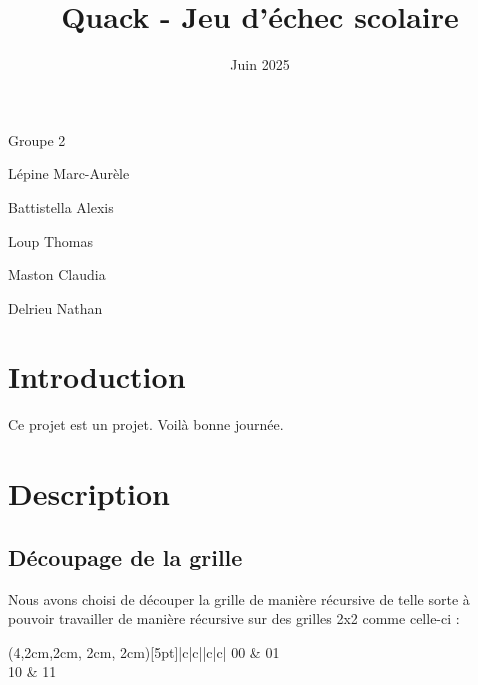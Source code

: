 \documentclass[12pt]{article}
\title{\Huge\textbf{Quack - Jeu d'échec scolaire}}
\date{Juin 2025}
\begin{document}
\maketitle


\renewcommand{\headrulewidth}{0mm} %
\renewcommand{\footrulewidth}{0.1mm} %


\centerline{Groupe 2}
\vspace{\fill}
Lépine Marc-Aurèle \par
Battistella Alexis \par
Loup Thomas \par
Maston Claudia \par
Delrieu Nathan



\newpage

\renewcommand\contentsname{\centering Table des matières}
\renewcommand\footnoterule{}

\tableofcontents

\newpage

\section{Introduction}
    Ce projet est un projet. Voilà bonne journée.
  
\section {Description}
    \subsection{Découpage de la grille}
    Nous avons choisi de découper la grille de manière récursive de telle sorte à pouvoir travailler de manière récursive sur des grilles 2x2 comme celle-ci :

    \label{sec:grid-2x2}
    \begin{center}
        \begin{TAB}(4,2cm,2cm, 2cm, 2cm)[5pt]{|c|c|}{|c|c|}%
            00 & 01 \\
            10 & 11 \\
        \end{TAB}
    \end{center}
\end{document}

